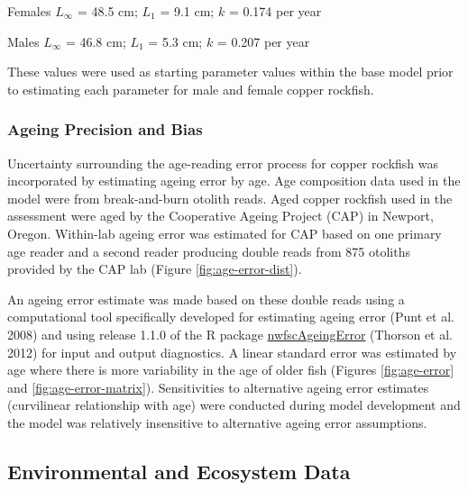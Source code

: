 \documentclass[11pt,
  english,
  letterpaper,
]{article}
\begin{document}
\begin{centering}

Females $L_{\infty}$ = 48.5 cm; $L_1$ = 9.1 cm; $k$ = 0.174 per year

Males $L_{\infty}$ = 46.8 cm; $L_1$ = 5.3 cm; $k$ = 0.207 per year

\end{centering}

\vspace{0.50cm}

These values were used as starting parameter values within the base model prior to estimating each parameter for male and female copper rockfish.

\hypertarget{ageing-precision-and-bias}{%
\subsubsection{Ageing Precision and Bias}\label{ageing-precision-and-bias}}

Uncertainty surrounding the age-reading error process for copper rockfish was incorporated by estimating ageing error by age. Age composition data used in the model were from break-and-burn otolith reads. Aged copper rockfish used in the assessment were aged by the Cooperative Ageing Project (CAP) in Newport, Oregon. Within-lab ageing error was estimated for CAP based on one primary age reader and a second reader producing double reads from 875 otoliths provided by the CAP lab (Figure \ref{fig:age-error-dist}).

An ageing error estimate was made based on these double reads using a computational tool specifically developed for estimating ageing error (Punt et al. 2008) and using release 1.1.0 of the R package \href{https://github.com/nwfsc-assess/nwfscAgeingError}{nwfscAgeingError} (Thorson et al. 2012) for input and output diagnostics. A linear standard error was estimated by age where there is more variability in the age of older fish (Figures \ref{fig:age-error} and \ref{fig:age-error-matrix}). Sensitivities to alternative ageing error estimates (curvilinear relationship with age) were conducted during model development and the model was relatively insensitive to alternative ageing error assumptions.

\hypertarget{environmental-and-ecosystem-data}{%
\subsection{Environmental and Ecosystem Data}\label{environmental-and-ecosystem-data}}
\end{document}
